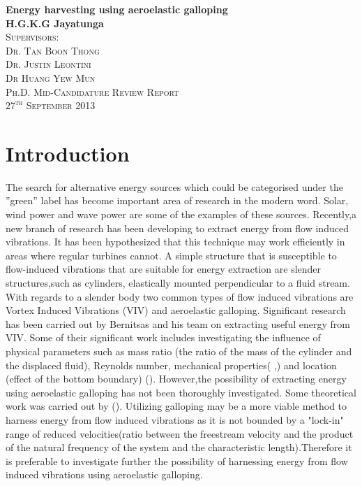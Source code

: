 \documentclass{article}
\begin{document}
\begin{titlepage}
\begin{center}
{\huge \bfseries Energy harvesting using aeroelastic galloping}\\[2.5cm]
{\LARGE \bfseries H.G.K.G Jayatunga}\\[2.5cm]
\textsc{\Large Supervisors:\\[0.5cm] Dr. Tan Boon Thong \\[0.4cm] Dr. Justin Leontini \\[0.5cm] Dr Huang Yew Mun}\\[6.5cm]
\textsc{\Large Ph.D. Mid-Candidature Review Report}\\

\vfill
\textsc{\Large $27^{\text{th}}$ September 2013}
\end{center}
\end{titlepage}
\tableofcontents

\section{Introduction}
The search for alternative energy sources which could be categorised under the ”green” label has become important area of research in the modern word. Solar, wind power and wave power are some of the examples of these sources. Recently,a new branch of research has been developing to extract energy from flow induced vibrations. It has been hypothesized that this technique may work efficiently in areas where regular turbines cannot.
A simple structure that is susceptible to flow-induced vibrations that are suitable for energy extraction are slender structures,such as cylinders, elastically mounted perpendicular to a fluid stream. With regards to a slender body two common types of   flow induced vibrations are Vortex Induced Vibrations (VIV) and aeroelastic galloping. Significant research has been carried out by Bernitsas and his team on extracting useful energy from VIV. Some of their significant work includes investigating the influence  of physical parameters such as mass ratio (the ratio of the mass of the cylinder and the displaced fluid), Reynolds number, mechanical properties(\cite{Raghavan2010a} ,\cite{Lee2011b}) and location (effect of the bottom boundary) (\cite{Raghavan2009}). However,the possibility of extracting energy using aeroelastic galloping has not been thoroughly investigated. Some theoretical work was carried out by (\cite{Barrero-Gil2010a}). Utilizing galloping may be a more viable method to harness energy from flow induced vibrations as it is not bounded by a "lock-in" range of reduced velocities(ratio between the freestream velocity and the product of the natural frequency of the system and the characteristic length).Therefore it is preferable to investigate further the possibility of harnessing energy from flow induced vibrations using aeroelastic galloping. 
\end{document}
